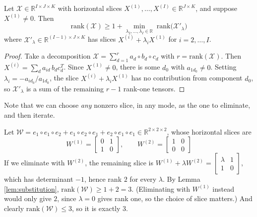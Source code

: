    \begin{lemma}[Substitution]
      \label{lem:substitution}
      Let $\mathcal{X} \in \mathbb{R}^{I \times J \times K}$ with horizontal slices $X^{(1)}, \ldots, X^{(I)} \in \mathbb{R}^{J \times K}$, and suppose $X^{(1)} \neq 0$. Then
      \begin{equation}
        \mathrm{rank}(\mathcal{X}) \geq 1 + \min_{\lambda_2, \ldots, \lambda_I \in \mathbb{R}} \; \mathrm{rank} \big( \mathcal{X}'_\lambda \big)
      \end{equation}
      where $\mathcal{X}'_\lambda \in \mathbb{R}^{(I-1) \times J \times K}$ has slices $X^{(i)} + \lambda_i X^{(1)}$ for $i = 2, \ldots, I$.
    \end{lemma}
    \begin{proof}
      Take a decomposition $\mathcal{X} = \sum_{d=1}^r a_d \circ b_d \circ c_d$ with $r = \mathrm{rank}(\mathcal{X})$. Then $X^{(i)} = \sum_d a_{id} \, b_d c_d^T$. Since $X^{(1)} \neq 0$, there is some $d_0$ with $a_{1 d_0} \neq 0$. Setting $\lambda_i = -a_{i d_0} / a_{1 d_0}$, the slice $X^{(i)} + \lambda_i X^{(1)}$ has no contribution from component $d_0$, so $\mathcal{X}'_\lambda$ is a sum of the remaining $r - 1$ rank-one tensors.
    \end{proof}

    Note that we can choose \textit{any} nonzero slice, in any mode, as the one to eliminate, and then iterate.

    \begin{example}
      Let $\mathcal{W} = e_1 \circ e_1 \circ e_2 + e_1 \circ e_2 \circ e_1 + e_2 \circ e_1 \circ e_1 \in \mathbb{R}^{2 \times 2 \times 2}$, whose horizontal slices are
      \begin{equation}
        W^{(1)} = \begin{bmatrix} 0 & 1 \\ 1 & 0 \end{bmatrix}, \qquad W^{(2)} = \begin{bmatrix} 1 & 0 \\ 0 & 0 \end{bmatrix}
      \end{equation}
      If we eliminate with $W^{(2)}$, the remaining slice is $W^{(1)} + \lambda W^{(2)} = \begin{bmatrix} \lambda & 1 \\ 1 & 0 \end{bmatrix}$, which has determinant $-1$, hence rank $2$ for every $\lambda$. By Lemma \ref{lem:substitution}, $\mathrm{rank}(\mathcal{W}) \geq 1 + 2 = 3$. (Eliminating with $W^{(1)}$ instead would only give $2$, since $\lambda = 0$ gives rank one, so the choice of slice matters.) And clearly $\mathrm{rank}(\mathcal{W}) \leq 3$, so it is exactly $3$.
    \end{example}

